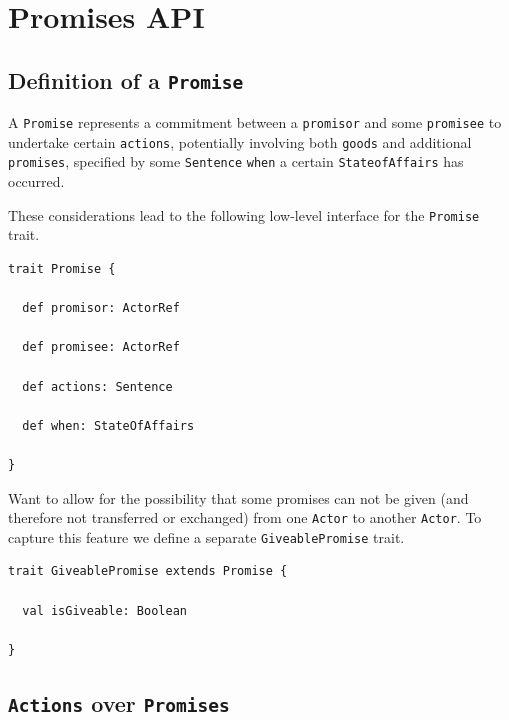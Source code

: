 \documentclass[a4paper]{article}
\begin{document}
\appendix
\section{Promises API}
\label{Promise API}

\subsection{Definition of a \texttt{Promise}}
A \texttt{Promise} represents a commitment between a \texttt{promisor} and some \texttt{promisee} to undertake certain \texttt{actions}, potentially involving both \texttt{goods} and additional \texttt{promises}, specified by some \texttt{Sentence} \texttt{when} a certain \texttt{StateofAffairs} has occurred. 

These considerations lead to the following low-level interface for the \texttt{Promise} trait.

\begin{verbatim}
trait Promise {

  def promisor: ActorRef
 
  def promisee: ActorRef
  
  def actions: Sentence
  
  def when: StateOfAffairs

}
\end{verbatim}

Want to allow for the possibility that some promises can not be given (and therefore not transferred or exchanged) from one \texttt{Actor} to another \texttt{Actor}. To capture this feature we define a separate \texttt{GiveablePromise} trait.

\begin{verbatim}
trait GiveablePromise extends Promise {

  val isGiveable: Boolean

}
\end{verbatim}

\subsection{\texttt{Actions} over \texttt{Promises}}
\end{document}
